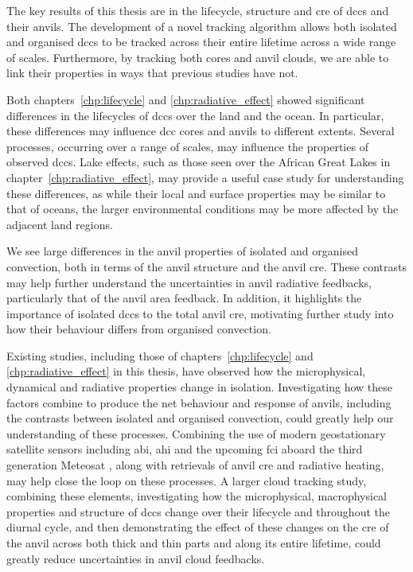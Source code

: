 The key results of this thesis are in the lifecycle, structure and \acrshort{cre} of \acrshort{dcc}s and their anvils.
The development of a novel tracking algorithm allows both isolated and organised \acrshort{dcc}s to be tracked across their entire lifetime across a wide range of scales.
Furthermore, by tracking both cores and anvil clouds, we are able to link their properties in ways that previous studies have not.

Both chapters~\ref{chp:lifecycle} and \ref{chp:radiative_effect} showed significant differences in the lifecycles of \acrshort{dcc}s over the land and the ocean.
In particular, these differences may influence \acrshort{dcc} cores and anvils to different extents.
Several processes, occurring over a range of scales, may influence the properties of observed \acrshort{dcc}s.
Lake effects, such as those seen over the African Great Lakes in chapter~\ref{chp:radiative_effect}, may provide a useful case study for understanding these differences, as while their local and surface properties may be similar to that of oceans, the larger environmental conditions may be more affected by the adjacent land regions.

We see large differences in the anvil properties of isolated and organised convection, both in terms of the anvil structure and the anvil \acrshort{cre}.
These contrasts may help further understand the uncertainties in anvil radiative feedbacks, particularly that of the anvil area feedback.
In addition, it highlights the importance of isolated \acrshort{dcc}s to the total anvil \acrshort{cre}, motivating further study into how their behaviour differs from organised convection.

Existing studies, including those of chapters~\ref{chp:lifecycle} and \ref{chp:radiative_effect} in this thesis, have observed how the microphysical, dynamical and radiative properties change in isolation.
Investigating how these factors combine to produce the net behaviour and response of anvils, including the contrasts between isolated and organised convection, could greatly help our understanding of these processes.
Combining the use of modern geostationary satellite sensors including \acrshort{abi}, \acrlong{ahi} and the upcoming \acrlong{fci} aboard the third generation Meteosat \citep{durand_flexible_2015}, along with retrievals of anvil \acrshort{cre} and radiative heating, may help close the loop on these processes.
A larger cloud tracking study, combining these elements, investigating how the microphysical, macrophysical properties and structure of \acrshort{dcc}s change over their lifecycle and throughout the diurnal cycle, and then demonstrating the effect of these changes on the \acrshort{cre} of the anvil across both thick and thin parts and along its entire lifetime, could greatly reduce uncertainties in anvil cloud feedbacks.

